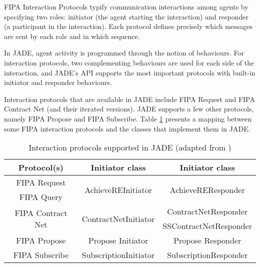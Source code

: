 

FIPA Interaction Protocols typify communication interactions among agents by specifying two roles: initiator (the agent starting the interaction) and responder (a participant in the interaction). Each protocol defines precisely which messages are sent by each role and in which sequence.

In JADE, agent activity is programmed through the notion of behaviours. For interaction protocols, two complementing behaviours are used for each side of the interaction, and JADE’s API supports the most important protocols with built-in initiator and responder behaviours.

Interaction protocols that are available in JADE include FIPA Request and FIPA Contract Net (and their iterated versions). JADE supports a few other protocols, namely FIPA Propose and FIPA Subscribe. Table \ref{tab:fipa_protos} presents a mapping between some FIPA interaction protocols and the classes that implement them in JADE.

\begin{table}
	\normalsize
	\caption{Interaction protocols supported in JADE (adapted from \cite{bellifemine2007developing})}
	\label{tab:fipa_protos}
	\begin{center}
		\begin{tabular}{c|c|c}
		\hline
		\textbf{Protocol(s)} & \textbf{Initiator class} & \textbf{Initiator class} \\
		\hline
		FIPA Request 	& \multirow{2}{*}{AchieveREInitiator} & \multirow{2}{*}{AchieveREResponder}\\
		FIPA Query 		& \\
		\hline
		\multirow{2}{*}{FIPA Contract Net} & \multirow{2}{*}{ContractNetInitiator} & ContractNetResponder \\
		 &  & SSContractNetResponder \\
		\hline
		FIPA Propose & Propose Initiator & Propose Responder \\
		\hline 
		FIPA Subscribe & SubscriptionInitiator & SubscriptionResponder \\
		\hline
		\end{tabular}
	\end{center}
\end{table}

